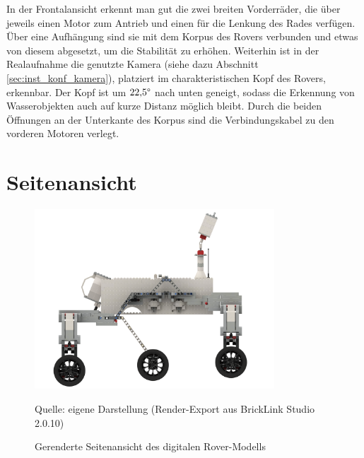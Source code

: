In der Frontalansicht erkennt man gut die zwei breiten Vorderräder, die über jeweils einen Motor zum Antrieb und einen für die Lenkung des Rades verfügen.
Über eine Aufhängung sind sie mit dem Korpus des Rovers verbunden und etwas von diesem abgesetzt, um die Stabilität zu erhöhen.
Weiterhin ist in der Realaufnahme die genutzte Kamera (siehe dazu Abschnitt \ref{sec:inst_konf_kamera}), platziert im charakteristischen Kopf des Rovers, erkennbar.
Der Kopf ist um $22{,}5 \degree$ nach unten geneigt, sodass die Erkennung von Wasserobjekten auch auf kurze Distanz möglich bleibt.
Durch die beiden Öffnungen an der Unterkante des Korpus sind die Verbindungskabel zu den vorderen Motoren verlegt.

\section{Seitenansicht}
\label{sec:seitenansicht}

\begin{figure}
	\centering
	\includegraphics[width=0.8\textwidth]{../Images/20200424_Mars_Rover_V5_side.png}
	\vspace{0.5em}
	\parbox[c]{0.8\linewidth}{\footnotesize
		\centering
		\vspace{1em}
		Quelle: eigene Darstellung (Render-Export aus BrickLink Studio 2.0.10)
	}
	\caption{Gerenderte Seitenansicht des digitalen Rover-Modells}
	\label{fig:roversiderender}
\end{figure}

